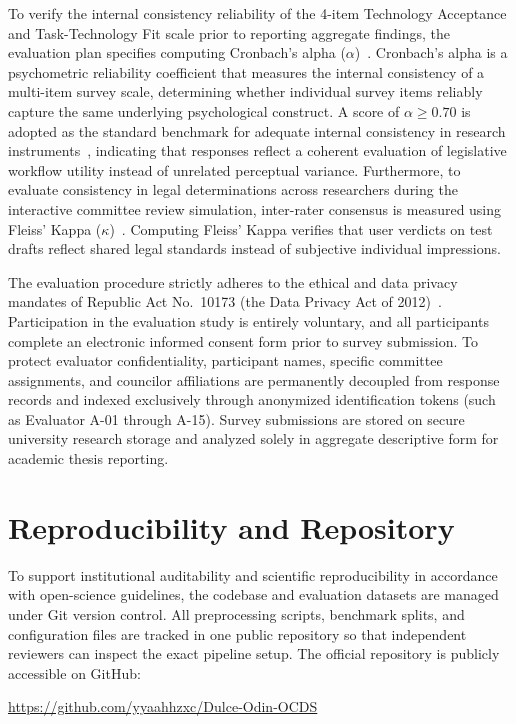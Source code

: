     To verify the internal consistency reliability of the 4-item Technology Acceptance and Task-Technology Fit scale prior to reporting aggregate findings, the evaluation plan specifies computing Cronbach's alpha ($\alpha$)~\cite{cronbach1951coefficient}. Cronbach's alpha is a psychometric reliability coefficient that measures the internal consistency of a multi-item survey scale, determining whether individual survey items reliably capture the same underlying psychological construct. A score of $\alpha \ge 0.70$ is adopted as the standard benchmark for adequate internal consistency in research instruments~\cite{taber2018use}, indicating that responses reflect a coherent evaluation of legislative workflow utility instead of unrelated perceptual variance. Furthermore, to evaluate consistency in legal determinations across researchers during the interactive committee review simulation, inter-rater consensus is measured using Fleiss' Kappa ($\kappa$)~\cite{fleiss1971measuring}. Computing Fleiss' Kappa verifies that user verdicts on test drafts reflect shared legal standards instead of subjective individual impressions.

    The evaluation procedure strictly adheres to the ethical and data privacy mandates of Republic Act No.~10173 (the Data Privacy Act of 2012)~\cite{philgov2012ra10173}. Participation in the evaluation study is entirely voluntary, and all participants complete an electronic informed consent form prior to survey submission. To protect evaluator confidentiality, participant names, specific committee assignments, and councilor affiliations are permanently decoupled from response records and indexed exclusively through anonymized identification tokens (such as Evaluator A-01 through A-15). Survey submissions are stored on secure university research storage and analyzed solely in aggregate descriptive form for academic thesis reporting.

    \section{Reproducibility and Repository}
    \label{sec:version_control_reproducibility}
    To support institutional auditability and scientific reproducibility in accordance with open-science guidelines, the codebase and evaluation datasets are managed under Git version control. All preprocessing scripts, benchmark splits, and configuration files are tracked in one public repository so that independent reviewers can inspect the exact pipeline setup. The official repository is publicly accessible on GitHub:
    \begin{center}
        \url{https://github.com/yyaahhzxc/Dulce-Odin-OCDS}
    \end{center}
    
